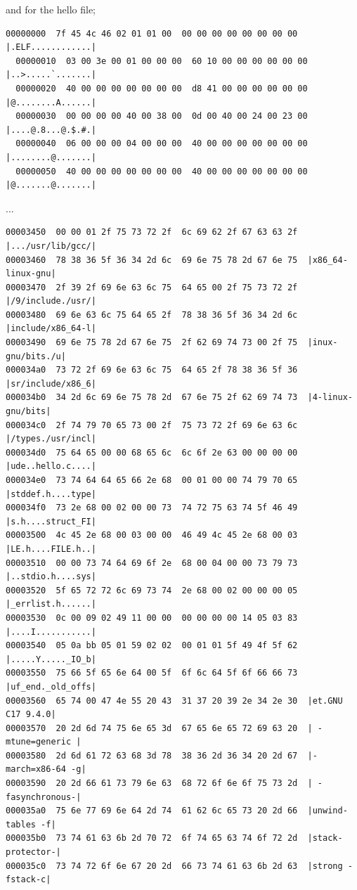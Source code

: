 \documentclass[]{project_plan}
\begin{document}
and for the hello file;

\begin{lstlisting}[basicstyle=\tiny]
  00000000  7f 45 4c 46 02 01 01 00  00 00 00 00 00 00 00 00  |.ELF............|
  00000010  03 00 3e 00 01 00 00 00  60 10 00 00 00 00 00 00  |..>.....`.......|
  00000020  40 00 00 00 00 00 00 00  d8 41 00 00 00 00 00 00  |@........A......|
  00000030  00 00 00 00 40 00 38 00  0d 00 40 00 24 00 23 00  |....@.8...@.$.#.|
  00000040  06 00 00 00 04 00 00 00  40 00 00 00 00 00 00 00  |........@.......|
  00000050  40 00 00 00 00 00 00 00  40 00 00 00 00 00 00 00  |@.......@.......|
\end{lstlisting}
...
\begin{lstlisting}[basicstyle=\tiny]
  00003450  00 00 01 2f 75 73 72 2f  6c 69 62 2f 67 63 63 2f  |.../usr/lib/gcc/|
00003460  78 38 36 5f 36 34 2d 6c  69 6e 75 78 2d 67 6e 75  |x86_64-linux-gnu|
00003470  2f 39 2f 69 6e 63 6c 75  64 65 00 2f 75 73 72 2f  |/9/include./usr/|
00003480  69 6e 63 6c 75 64 65 2f  78 38 36 5f 36 34 2d 6c  |include/x86_64-l|
00003490  69 6e 75 78 2d 67 6e 75  2f 62 69 74 73 00 2f 75  |inux-gnu/bits./u|
000034a0  73 72 2f 69 6e 63 6c 75  64 65 2f 78 38 36 5f 36  |sr/include/x86_6|
000034b0  34 2d 6c 69 6e 75 78 2d  67 6e 75 2f 62 69 74 73  |4-linux-gnu/bits|
000034c0  2f 74 79 70 65 73 00 2f  75 73 72 2f 69 6e 63 6c  |/types./usr/incl|
000034d0  75 64 65 00 00 68 65 6c  6c 6f 2e 63 00 00 00 00  |ude..hello.c....|
000034e0  73 74 64 64 65 66 2e 68  00 01 00 00 74 79 70 65  |stddef.h....type|
000034f0  73 2e 68 00 02 00 00 73  74 72 75 63 74 5f 46 49  |s.h....struct_FI|
00003500  4c 45 2e 68 00 03 00 00  46 49 4c 45 2e 68 00 03  |LE.h....FILE.h..|
00003510  00 00 73 74 64 69 6f 2e  68 00 04 00 00 73 79 73  |..stdio.h....sys|
00003520  5f 65 72 72 6c 69 73 74  2e 68 00 02 00 00 00 05  |_errlist.h......|
00003530  0c 00 09 02 49 11 00 00  00 00 00 00 14 05 03 83  |....I...........|
00003540  05 0a bb 05 01 59 02 02  00 01 01 5f 49 4f 5f 62  |.....Y....._IO_b|
00003550  75 66 5f 65 6e 64 00 5f  6f 6c 64 5f 6f 66 66 73  |uf_end._old_offs|
00003560  65 74 00 47 4e 55 20 43  31 37 20 39 2e 34 2e 30  |et.GNU C17 9.4.0|
00003570  20 2d 6d 74 75 6e 65 3d  67 65 6e 65 72 69 63 20  | -mtune=generic |
00003580  2d 6d 61 72 63 68 3d 78  38 36 2d 36 34 20 2d 67  |-march=x86-64 -g|
00003590  20 2d 66 61 73 79 6e 63  68 72 6f 6e 6f 75 73 2d  | -fasynchronous-|
000035a0  75 6e 77 69 6e 64 2d 74  61 62 6c 65 73 20 2d 66  |unwind-tables -f|
000035b0  73 74 61 63 6b 2d 70 72  6f 74 65 63 74 6f 72 2d  |stack-protector-|
000035c0  73 74 72 6f 6e 67 20 2d  66 73 74 61 63 6b 2d 63  |strong -fstack-c|

\end{lstlisting}
\end{document}
